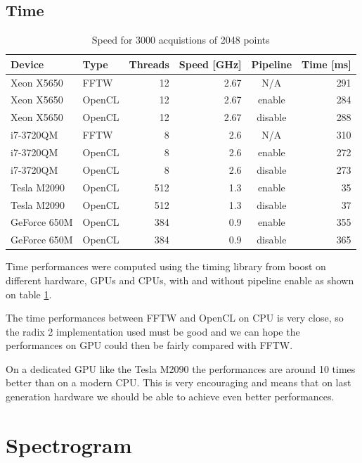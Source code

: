    \subsection{Time}

	\begin{table}[H]
		\caption{Speed for 3000 acquistions of 2048 points}
		\centering
		\label{tab:speed}
		\begin{tabular}{|l|lrrcr|}
			\hline
				Device & Type & Threads & Speed [GHz] & Pipeline & Time [ms] \\
			\hline
			\hline
				Xeon X5650 & FFTW & 12 & 2.67 & N/A & 291 \\
				Xeon X5650 & OpenCL & 12 & 2.67 & enable & 284 \\
				Xeon X5650 & OpenCL & 12 & 2.67 & disable & 288 \\
			\hline
				i7-3720QM & FFTW & 8 & 2.6 & N/A & 310 \\
				i7-3720QM & OpenCL & 8 & 2.6 & enable & 272 \\
				i7-3720QM & OpenCL & 8 & 2.6 & disable & 273 \\
			\hline
			\hline
				Tesla M2090 & OpenCL & 512 & 1.3 & enable & 35 \\
				Tesla M2090 & OpenCL & 512 & 1.3 & disable & 37 \\
			\hline
				GeForce 650M & OpenCL & 384 & 0.9 & enable & 355 \\
				GeForce 650M & OpenCL & 384 & 0.9 & disable & 365 \\
			\hline
		\end{tabular}
	\end{table}

	Time performances were computed using the timing library from boost \cite{boost} on different hardware, \glspl{GPU} and \glspl{CPU}, with and without pipeline enable as shown on table \ref{tab:speed}.

	The time performances between \gls{FFTW} and \gls{OpenCL} on \gls{CPU} is very close, so the radix 2 implementation used must be good and we can hope the performances on \gls{GPU} could then be fairly compared with \gls{FFTW}.

	On a dedicated \gls{GPU} like the Tesla M2090  the performances are around 10 times better than on a modern \gls{CPU}. This is very encouraging and means that on last generation hardware we should be able to achieve even better performances.
	
\section{Spectrogram}
\label{sec:spectrogram}

